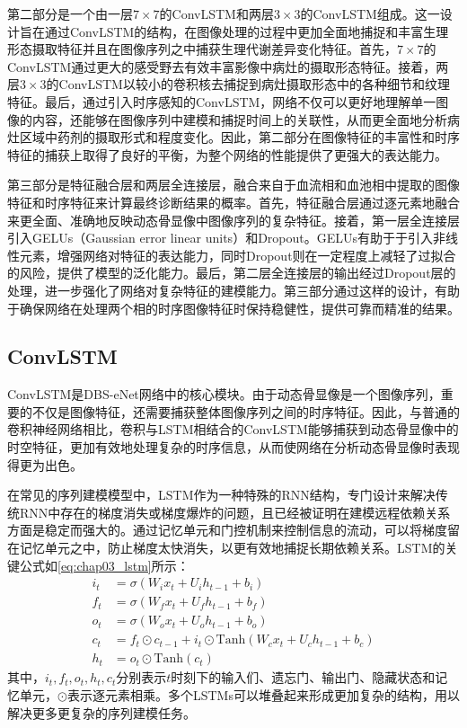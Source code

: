 第二部分是一个由一层\(7 \times 7\)的ConvLSTM和两层\(3 \times 3\)的ConvLSTM组成。这一设计旨在通过ConvLSTM的结构，在图像处理的过程中更加全面地捕捉和丰富生理形态摄取特征并且在图像序列之中捕获生理代谢差异变化特征。首先，\(7 \times 7\)的ConvLSTM通过更大的感受野去有效丰富影像中病灶的摄取形态特征。接着，两层\(3 \times 3\)的ConvLSTM以较小的卷积核去捕捉到病灶摄取形态中的各种细节和纹理特征。最后，通过引入时序感知的ConvLSTM，网络不仅可以更好地理解单一图像的内容，还能够在图像序列中建模和捕捉时间上的关联性，从而更全面地分析病灶区域中药剂的摄取形式和程度变化。因此，第二部分在图像特征的丰富性和时序特征的捕获上取得了良好的平衡，为整个网络的性能提供了更强大的表达能力。

第三部分是特征融合层和两层全连接层，融合来自于血流相和血池相中提取的图像特征和时序特征来计算最终诊断结果的概率。首先，特征融合层通过逐元素地融合来更全面、准确地反映动态骨显像中图像序列的复杂特征。接着，第一层全连接层引入GELUs（Gaussian error linear units）和Dropout\cite{srivastava2014dropout}。GELUs有助于于引入非线性元素，增强网络对特征的表达能力，同时Dropout则在一定程度上减轻了过拟合的风险，提供了模型的泛化能力。最后，第二层全连接层的输出经过Dropout层的处理，进一步强化了网络对复杂特征的建模能力。第三部分通过这样的设计，有助于确保网络在处理两个相的时序图像特征时保持稳健性，提供可靠而精准的结果。

\subsection{ConvLSTM}

ConvLSTM是DBS-eNet网络中的核心模块。由于动态骨显像是一个图像序列，重要的不仅是图像特征，还需要捕获整体图像序列之间的时序特征。因此，与普通的卷积神经网络相比，卷积与LSTM相结合的ConvLSTM能够捕获到动态骨显像中的时空特征，更加有效地处理复杂的时序信息，从而使网络在分析动态骨显像时表现得更为出色。

在常见的序列建模模型中，LSTM\cite{memory2010long}作为一种特殊的RNN结构，专门设计来解决传统RNN中存在的梯度消失或梯度爆炸的问题，且已经被证明在建模远程依赖关系方面是稳定而强大的。通过记忆单元和门控机制来控制信息的流动，可以将梯度留在记忆单元之中，防止梯度太快消失，以更有效地捕捉长期依赖关系。LSTM的关键公式如\ref{eq:chap03_lstm}所示：
\begin{equation}
  \begin{aligned}
    i_t & = \sigma(W_i x_t + U_i h_{t-1} + b_i)                                    \\
    f_t & = \sigma(W_f x_t + U_f h_{t-1} + b_f)                                    \\
    o_t & = \sigma(W_o x_t + U_o h_{t-1} + b_o)                                    \\
    c_t & = f_t \odot c_{t-1} + i_t \odot \text{Tanh}(W_c x_t + U_c h_{t-1} + b_c) \\
    h_t & = o_t \odot \text{Tanh}(c_t)
  \end{aligned}
  \label{eq:chap03_lstm}
\end{equation}
其中，\(i_t,f_t,o_t,h_t,c_t\)分别表示\(t\)时刻下的输入们、遗忘门、输出门、隐藏状态和记忆单元，\(\odot\)表示逐元素相乘。多个LSTMs可以堆叠起来形成更加复杂的结构，用以解决更多更复杂的序列建模任务。

